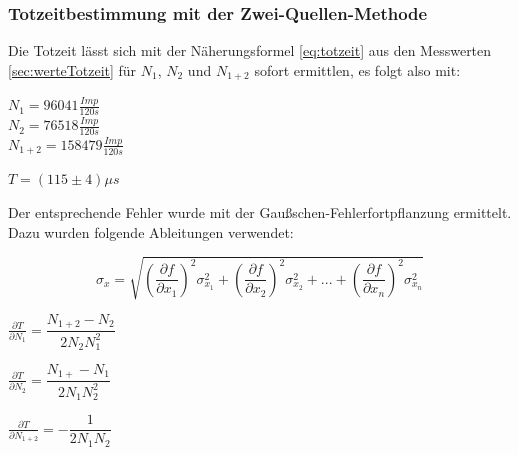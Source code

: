 \subsubsection{Totzeitbestimmung mit der Zwei-Quellen-Methode}
\label{sec:totzeitZ}
Die Totzeit lässt sich mit der Näherungsformel \autoref{eq:totzeit} aus den Messwerten 
\autoref{sec:werteTotzeit} für $N_1$, $N_2$ und $N_{1+2}$ sofort ermittlen, es folgt also mit:
\begin{center}
  $N_1=96041 \frac{Imp}{120 s}$\\
  $N_2=76518 \frac{Imp}{120 s}$\\
  $N_{1+2}=158479 \frac{Imp}{120 s}$
\end{center}
\begin{center}
  $T=(115\pm4) \mu s$
\end{center}
Der entsprechende Fehler wurde mit der Gaußschen-Fehlerfortpflanzung ermittelt.
Dazu wurden folgende Ableitungen verwendet:
\begin{center}
  \begin{equation}
    \label{eq:gaussfehler}  
  \sigma_x=\sqrt{(\frac{\partial f}{\partial x_1})^2\sigma_{x_1}^2+(\frac{\partial f}{\partial x_2})^2\sigma_{x_2}^2+...+(\frac{\partial f}{\partial x_n})^2\sigma_{x_n}^2}
  \end{equation}
  \end{center}
\begin{center}
  $\frac{\partial T}{\partial N_1}=\dfrac{N_{1+2}-N_2}{2N_2N_1^2}$\\
\end{center}
\begin{center}
  $\frac{\partial T}{\partial N_2}=\dfrac{N_{1+}-N_1}{2N_1N_2^2}$\\
\end{center}
\begin{center}
  $\frac{\partial T}{\partial N_{1+2}}=-\dfrac{1}{2N_1N_2}$
\end{center}

